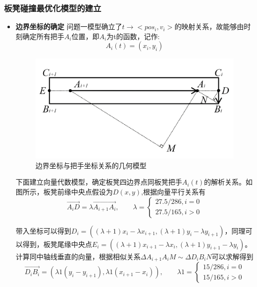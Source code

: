 \documentclass[a4paper]{article}
\begin{document}
        \subsubsection{板凳碰撞最优化模型的建立}
    \begin{itemize}
        \item {\textbf{边界坐标的确定}}
        问题一模型确立了$t\to<pos_i,v_i>$的映射关系，故能够由时刻确定所有把手$A_{i}$位置，即$A_{i}$为t的函数，记作:$$A_{i}(t) = (x_i, y_i)$$
        \begin{figure}[H]
            \centering
            \includegraphics[width=0.5\linewidth]{image/Figure_5211.png}
            \caption{边界坐标与把手坐标关系的几何模型}
            \label{fig:enter-label}
        \end{figure}

        下面建立向量代数模型，确定板凳四边界点同板凳把手$A_i(t)$的解析关系。如图所示，板凳前缘中央点假设为$D(x,y)$,根据向量平行关系有
        $$
                   \overrightarrow{A_iD} = \lambda\overrightarrow{A_{i+1}A_i}
        ,\quad\quad \lambda = \left\{ \begin{array}{c}
              27.5 / 286, i = 0 \\
              27.5 / 165, i > 0

        \end{array}\right.
        $$

        带入坐标可以得到$D_i = ((\lambda + 1) x_{i} - \lambda x_{i + 1}, (\lambda + 1) y_{i} - \lambda y_{i + 1})$，同理可以得到，板凳尾缘中央点$E_i = ((\lambda + 1) x_{i + 1} - \lambda x_{i}, (\lambda + 1) y_{i + 1} - \lambda y_{i})$。
        计算同中轴线垂直的向量，根据相似关系$\Delta A_{i+ 1}A_iM \sim \Delta D_iB_iN$可以求解得到
        $$\overrightarrow{D_i B_i} = (\lambda 1 (y_i - y_{i + 1}), \lambda 1 (x_{i + 1} - x_i)),
        \quad \quad \lambda 1 = \left\{ \begin{array}{c}
             15/286, i = 0  \\
             15/165, i > 0
        \end{array}
        \right.$$


\end{itemize}
\end{document}
